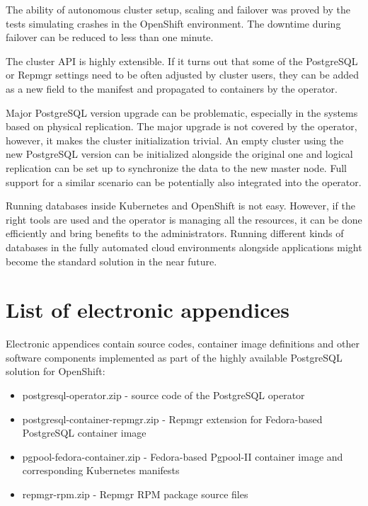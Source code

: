 \documentclass[
  digital, %
  twoside, %
  table,   %
  nolof,   %
  nolot,   %
]{fithesis3}
\begin{document}
The ability of autonomous cluster setup, scaling and failover was proved by the tests simulating crashes in the OpenShift environment. The downtime during failover can be reduced to less than one minute.

The cluster API is highly extensible. If it turns out that some of the PostgreSQL or Repmgr settings need to be often adjusted by cluster users, they can be added as a new field to the manifest and propagated to containers by the operator.

Major PostgreSQL version upgrade can be problematic, especially in the systems based on physical replication. The major upgrade is not covered by the operator, however, it makes the cluster initialization trivial. An empty cluster using the new PostgreSQL version can be initialized alongside the original one and logical replication can be set up to synchronize the data to the new master node. Full support for a similar scenario can be potentially also integrated into the operator.

Running databases inside Kubernetes and OpenShift is not easy. However, if the right tools are used and the operator is managing all the resources, it can be done efficiently and bring benefits to the administrators. Running different kinds of databases in the fully automated cloud environments alongside applications might become the standard solution in the near future.


\appendix %
\chapter{List of electronic appendices} \label{chap:appendices}
Electronic appendices contain source codes, container image definitions and other software components implemented as part of the highly available PostgreSQL solution for OpenShift:
\begin{itemize}
  \item postgresql-operator.zip - source code of the PostgreSQL operator
  \item postgresql-container-repmgr.zip - Repmgr extension for Fedora-based PostgreSQL container image
  \item pgpool-fedora-container.zip - Fedora-based Pgpool-II container image and corresponding Kubernetes manifests
  \item repmgr-rpm.zip - Repmgr RPM package source files
\end{itemize}
\end{document}
